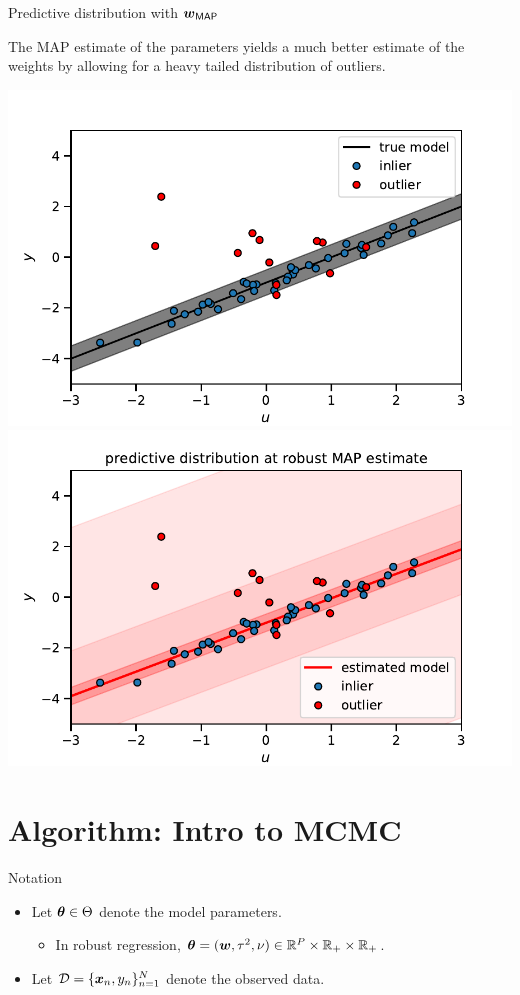 \documentclass[aspectratio=169]{beamer}
\begin{document}
\begin{frame}{Predictive distribution with $\boldsymbol{w}_{\mathsf{MAP}}$}

The MAP estimate of the parameters yields a much better estimate of the weights by allowing for a heavy tailed distribution of outliers.

\centering
\includegraphics[width=.49\textwidth]{figures/lap3/data.pdf}
\includegraphics[width=.49\textwidth]{figures/lap3/robust_map_pred.pdf}
    
\end{frame}

\section{Algorithm: Intro to MCMC}
\label{sec:intro_mcmc}

\begin{frame}{Notation}
\begin{itemize}
    \item Let $\boldsymbol{\theta} \in \Theta$ denote the model parameters. 
    \begin{itemize}
        \item In robust regression, $\boldsymbol{\theta} = (\boldsymbol{w}, \tau^2, \nu) \in \mathbb{R}^P \times \mathbb{R}_+ \times \mathbb{R}_+$.
    \end{itemize}
    
    \item Let $\mathcal{D} = \{\boldsymbol{x}_n, y_n\}_{n=1}^N$ denote the observed data.
\end{itemize}
    
\end{frame}
\end{document}
